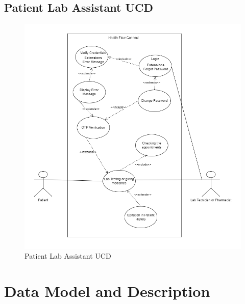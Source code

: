 \subsection{Patient Lab Assistant UCD}
\begin{figure}[h!]
    \centering
    \includegraphics[width=1.1\textwidth]{Patient_Lab_Assistant_Pharmacist_UCD.png}
    \caption{Patient Lab Assistant UCD}
    \label{fig:patient_lab_pharmacist_ucd}
\end{figure}
\clearpage
\section{Data Model and Description} 

